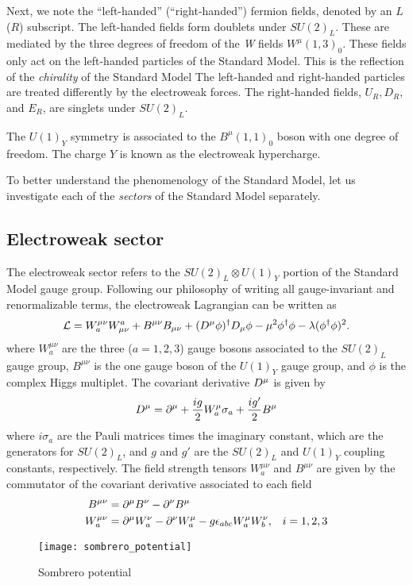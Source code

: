 Next, we note the ``left-handed'' (``right-handed'') fermion fields, denoted by an $L$ ($R$) subscript.
The left-handed fields form doublets under $SU(2)_L$.
These are mediated by the three degrees of freedom of the  \textit{W} fields $W^\mu(1,3)_0$.
These fields only act on the left-handed particles of the Standard Model.
This is the reflection of the \textit{chirality} of the Standard Model
The left-handed and right-handed particles are treated differently by the electroweak forces.
The right-handed fields, $U_R, D_R$, and $E_R$, are singlets under $SU(2)_L$.

The $U(1)_Y$ symmetry is associated to the $B^\mu(1,1)_0$ boson with one degree of freedom.
The charge $Y$ is known as the electroweak hypercharge.

To better understand the phenomenology of the Standard Model, let us investigate each of the \textit{sectors} of the Standard Model separately.

\subsection{Electroweak sector}

The electroweak sector refers to the $SU(2)_L \otimes U(1)_Y$ portion of the Standard Model gauge group.
Following our philosophy of writing all gauge-invariant and renormalizable terms, the electroweak Lagrangian can be written as
\begin{equation}\label{eq:ew_lagr}
\mathcal{L} =  W^{\mu\nu}_a W_{\mu\nu}^a + B^{\mu\nu} B_{\mu\nu} + (D^\mu \phi)^\dagger D_\mu \phi -  \mu^2 \phi^\dagger \phi - \lambda (\phi^\dagger \phi)^2.
\end{equation}
where $W^{\mu\nu}_a$ are the three ($a=1,2,3$) gauge bosons associated to the $SU(2)_L$ gauge group, $B^{\mu\nu}$ is the one gauge boson of the $U(1)_Y$ gauge group, and $\phi$ is the complex Higgs multiplet.
The covariant derivative $D^\mu$ is given by
\begin{equation}
D^\mu = \partial^\mu  + \frac{ig}{2} W^\mu_a \sigma_a + \frac{i g'}{2} B^\mu
\end{equation}
where $i \sigma_a$ are the Pauli matrices times the imaginary constant, which are the generators for $SU(2)_L$, and $g$ and $g'$ are the $SU(2)_L$ and $U(1)_Y$ coupling constants, respectively.
The field strength tensors  $W^{\mu\nu}_a$ and $B^{\mu\nu}$ are given by the commutator of the covariant derivative associated to each field
\begin{align} \label{eq:ew_field_strength_tensor}
B^{\mu\nu}   &=  \partial^\mu B^\nu - \partial^\nu B^\mu & \\
W^{\mu\nu}_a &=  \partial^\mu W^\nu_a - \partial^\nu W^\mu_a - g \epsilon_{abc} W^\mu_a W^\nu_b,& i = 1,2,3 \notag
\end{align}
\begin{figure}[tbp]
\caption{Sombrero potential}
\label{fig:sombrero}
\texttt{[image: sombrero\_potential]}
\end{figure}

